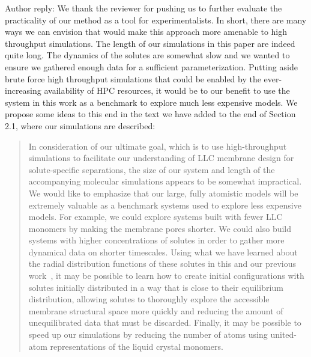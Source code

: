 \documentclass{article}
\begin{document}
\begin{enumerate}[label={Comment \theenumi :}, leftmargin=3.9\parindent]
    Author reply: We thank the reviewer for pushing us to further evaluate the practicality of our
    method as a tool for experimentalists. In short, there are many ways we can envision that 
    would make this approach more amenable to high throughput simulations. The length of our 
    simulations in this paper are indeed quite long. The dynamics of the solutes are somewhat 
    slow and we wanted to ensure we gathered enough data for a sufficient parameterization. 
    Putting aside brute force high throughput simulations that could be enabled by the 
    ever-increasing availability of HPC resources, it would be to our benefit to use the system
    in this work as a benchmark to explore much less expensive models.
    We propose some ideas to this end in the text we have added to the end of Section 2.1, where
    our simulations are described:
    \begin{quote}
    In consideration of our ultimate goal, which is to use high-throughput simulations to 
    facilitate our understanding of LLC membrane design for solute-specific separations, the size 
    of our system and length of the accompanying molecular simulations appears to be somewhat 
    impractical.
    We would like to emphasize that our large, fully atomistic models will be
    extremely valuable as a benchmark systems used to explore less expensive models. For example, we 
    could explore systems built with fewer LLC monomers by making the membrane pores shorter. We 
    could also build systems with higher concentrations of solutes in order to gather more 
    dynamical data on shorter timescales. Using what we have learned about the radial distribution
    functions of these solutes in this and our previous work~\cite{coscia_chemically_2019}, it may be possible to 
    learn how to create initial configurations with solutes initially distributed in a way that
    is close to their equilibrium distribution, allowing solutes to thoroughly explore the 
    accessible membrane structural space more quickly and reducing the amount of unequilibrated
    data that must be discarded. %
    Finally, it may be possible to speed up our simulations by 
    reducing the number of atoms using united-atom representations of the liquid crystal monomers.
    \end{quote}
    

\end{enumerate}
\end{document}
